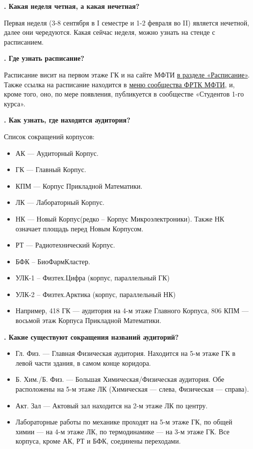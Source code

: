 \documentclass[14pt]{extarticle}
\newcounter{question}
\newcommand\Que[1]{%
    \begin{minipage}{\textwidth}
    \leavevmode\par
    \stepcounter{question}
    \noindent
    {\large\textbf{\thequestion. #1}}\par}
\newcommand\Ans[2][]{%
    \leavevmode\par\noindent
    {\leftskip37pt
    \textbf{#1}#2\par}
    \end{minipage}}
\newcommand\Partans[2][]{%
    \leavevmode\par\noindent
    {\leftskip37pt
    \textbf{#1}#2\par}}
\begin{document}
\Que{Какая неделя четная, а какая нечетная?}
\Ans{Первая неделя (3-8 сентября в I семестре и 1-2 февраля во II) является нечетной, далее они чередуются. Какая сейчас неделя, можно узнать на стенде с расписанием.}

\Que{Где узнать расписание?}
\Ans{Расписание висит на первом этаже ГК и на сайте МФТИ \href{https://mipt.ru/about/departments/uchebniy/schedule/study/}{в разделе «Расписание»}. Также ссылка на расписание находится в \href{https://vk.com/page-17708_53431659}{меню сообщества ФРТК МФТИ}, и, кроме того, оно, по мере появления, публикуется в сообществе «Студентов 1-го курса».}

\Que{Как узнать, где находится аудитория?}
\Partans{Список сокращений корпусов:}
\begin{itemize}
    \item АК — Аудиторный Корпус.
    \item ГК — Главный Корпус.
    \item КПМ — Корпус Прикладной Математики.
    \item ЛК — Лабораторный Корпус.
    \item НК — Новый Корпус(редко -- Корпус Микроэлектроники). Также НК означает площадь перед Новым Корпусом.
    \item РТ — Радиотехнический Корпус.
    \item БФК – БиоФармКластер.
    \item УЛК-1 – Физтех.Цифра (корпус, параллельный ГК)
    \item УЛК-2 – Физтех.Арктика (корпус, параллельный НК)
    \item Например, 418 ГК — аудитория на 4-м этаже Главного Корпуса, 806 КПМ — восьмой этаж Корпуса Прикладной Математики.
\end{itemize}
\end{minipage}

\Que{Какие существуют сокращения названий аудиторий?}
\begin{itemize}
    \item Гл. Физ. — Главная Физическая аудитория. Находится на 5-м этаже ГК в левой части здания, в самом конце коридора.
    \item Б. Хим./Б. Физ. — Большая Химическая/Физическая аудитория. Обе расположены на 5-м этаже ЛК (Химическая — слева, Физическая — справа).
    \item Акт. Зал — Актовый зал находится на 2-м этаже ЛК по центру.
    \item Лабораторные работы по механике проходят на 5-м этаже ГК, по общей химии — на 4-м этаже ЛК, по термодинамике — на 3-м этаже ГК. Все корпуса, кроме АК, РТ и БФК, соединены переходами.
\end{itemize}
\end{minipage}
\end{document}
